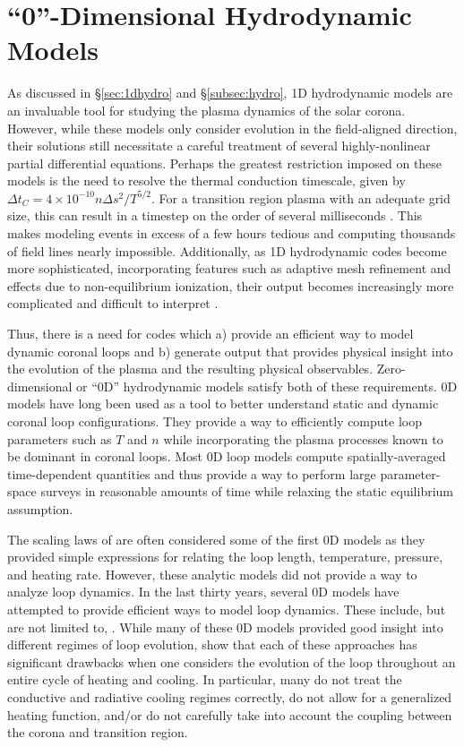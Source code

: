 \section{``0''-Dimensional Hydrodynamic Models }
\label{sec:0dmodels}
%
\par As discussed in \S\ref{sec:1dhydro} and \S\ref{subsec:hydro}, 1D hydrodynamic models are an invaluable tool for studying the plasma dynamics of the solar corona. However, while these models only consider evolution in the field-aligned direction, their solutions still necessitate a careful treatment of several highly-nonlinear partial differential equations. Perhaps the greatest restriction imposed on these models is the need to resolve the thermal conduction timescale, given by $\Delta t_C=4\times10^{-10}n\Delta s^2/T^{5/2}$. For a transition region plasma with an adequate grid size, this can result in a timestep on the order of several milliseconds \citep{bradshaw_influence_2013}. This makes modeling events in excess of a few hours tedious and computing thousands of field lines nearly impossible. Additionally, as 1D hydrodynamic codes become more sophisticated, incorporating features such as adaptive mesh refinement and effects due to non-equilibrium ionization, their output becomes increasingly more complicated and difficult to interpret \citep{cargill_enthalpy-based_2012-1}.
%
\par Thus, there is a need for codes which a) provide an efficient way to model dynamic coronal loops and b) generate output that provides physical insight into the evolution of the plasma and the resulting physical observables. Zero-dimensional or ``0D'' hydrodynamic models satisfy both of these requirements. 0D models have long been used as a tool to better understand static and dynamic coronal loop configurations. They provide a way to efficiently compute loop parameters such as $T$ and $n$ while incorporating the plasma processes known to be dominant in coronal loops. Most 0D loop models compute spatially-averaged time-dependent quantities and thus provide a way to perform large parameter-space surveys in reasonable amounts of time while relaxing the static equilibrium assumption.
%
\par The scaling laws of \citet{rosner_dynamics_1978} are often considered some of the first 0D models as they provided simple expressions for relating the loop length, temperature, pressure, and heating rate. However, these analytic models did not provide a way to analyze loop dynamics. In the last thirty years, several 0D models have attempted to provide efficient ways to model loop dynamics. These include, but are not limited to, \citet{fisher_equation_1990,kopp_coronal_1993,cargill_implications_1994,aschwanden_hydrodynamic_2009}. While many of these 0D models provided good insight into different regimes of loop evolution, \citet{cargill_enthalpy-based_2012-1} show that each of these approaches has significant drawbacks when one considers the evolution of the loop throughout an entire cycle of heating and cooling. In particular, many do not treat the conductive and radiative cooling regimes correctly, do not allow for a generalized heating function, and/or do not carefully take into account the coupling between the corona and transition region. 
%
%
